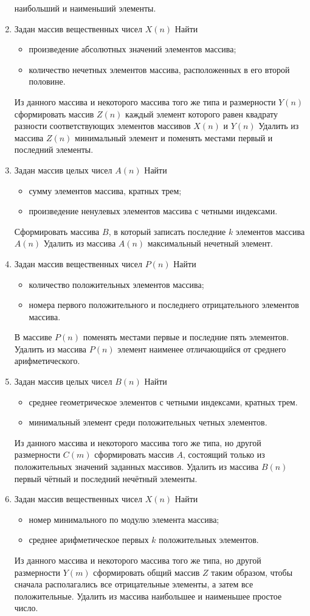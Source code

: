\begin{enumerate}
наибольший и наименьший элементы.
\item Задан массив вещественных чисел $X(n)$ Найти
\begin{itemize}
\item произведение абсолютных значений элементов массива;
\item количество нечетных элементов массива, расположенных в его второй половине.
\end{itemize}
Из данного массива и некоторого массива того же типа и размерности $Y(n)$ сформировать
массив $Z(n)$ каждый элемент которого равен квадрату разности соответствующих элементов
массивов $X(n)$ и $Y(n)$ Удалить из массива
$Z(n)$ минимальный элемент и поменять местами первый и последний элементы.
\item Задан массив целых чисел $A(n)$ Найти
\begin{itemize}
\item сумму элементов массива, кратных трем;
\item произведение ненулевых элементов массива с четными индексами.
\end{itemize}
Сформировать массива $B$, в который записать последние $k$ элементов массива
$A(n)$ Удалить из массива $A(n)$ максимальный нечетный элемент.
\item Задан массив вещественных чисел $P(n)$ Найти
\begin{itemize}
\item количество положительных элементов массива;
\item номера первого положительного и последнего отрицательного элементов массива.
\end{itemize}
В массиве $P(n)$ поменять местами первые и последние пять элементов. Удалить из массива
$P(n)$ элемент наименее отличающийся от среднего арифметического.
\item Задан массив целых чисел $B(n)$ Найти
\begin{itemize}
\item среднее геометрическое элементов с четными индексами, кратных трем.
\item минимальный элемент среди положительных четных элементов.
\end{itemize}
Из данного массива и некоторого массива того же типа, но другой размерности $C(m)$
сформировать массив $A$, состоящий только из положительных значений заданных массивов. Удалить из
массива $B(n)$ первый чётный и последний нечётный элементы.
\item Задан массив вещественных чисел $X(n)$ Найти
\begin{itemize}
\item номер минимального по модулю элемента массива;
\item среднее арифметическое первых $k$ положительных элементов.
\end{itemize}
Из данного массива и некоторого массива того же типа, но другой размерности $Y(m)$
сформировать общий массив $Z$ таким образом, чтобы сначала располагались все отрицательные элементы, а
затем все положительные. Удалить из массива наибольшее и наименьшее простое число.
\end{enumerate}

